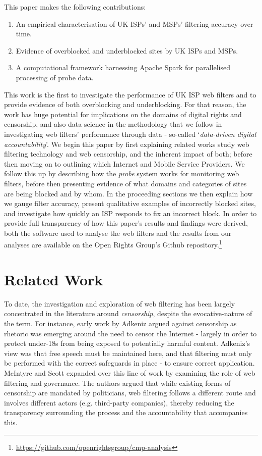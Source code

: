 \documentclass{bmcart}
\begin{document}
This paper makes the following contributions:
\begin{enumerate}
	\item An empirical characterisation of UK ISPs' and MSPs' filtering accuracy over time.
	\item Evidence of overblocked and underblocked sites by UK ISPs and MSPs.
	\item A computational framework harnessing Apache Spark for parallelised processing of probe data.
\end{enumerate}

This work is the first to investigate the performance of UK ISP web filters and to provide evidence of both overblocking and underblocking.
For that reason, the work has huge potential for implications on the domains of digital rights and censorship, and also data science in the methodology that we follow in investigating web filters' performance through data - so-called `\textit{data-driven digital accountability}'. 
We begin this paper by first explaining related works study web filtering technology and web censorship, and the inherent impact of both; before then moving on to outlining which Internet and Mobile Service Providers.
We follow this up by describing how the \textit{probe} system works for monitoring web filters, before then presenting evidence of what domains and categories of sites are being blocked and by whom.
In the proceeding sections we then explain how we gauge filter accuracy, present qualitative examples of incorrectly blocked sites, and investigate how quickly an ISP responds to fix an incorrect block.
In order to provide full transparency of how this paper's results and findings were derived, both the software used to analyse the web filters and the results from our analyses are available on the Open Rights Group's Github repository.\footnote{\url{https://github.com/openrightsgroup/cmp-analysis}}








\clearpage
\section*{Related Work}
To date, the investigation and exploration of web filtering has been largely concentrated in the literature around \textit{censorship}, despite the evocative-nature of the term.
For instance, early work by Adkeniz \cite{akdeniz2001internet} argued against censorship as rhetoric was emerging around the need to censor the Internet - largely in order to protect under-18s from being exposed to potentially harmful content.
Adkeniz's view was that free speech must be maintained here, and that filtering must only be performed with the correct safeguards in place - to ensure correct application.
McIntyre and Scott \cite{mcintyre2008internet} expanded over this line of work by examining the role of web filtering and governance.
The authors argued that while existing forms of censorship are mandated by politicians, web filtering follows a different route and involves different actors (e.g. third-party companies), thereby reducing the transparency surrounding the process and the accountability that accompanies this.
\end{document}
